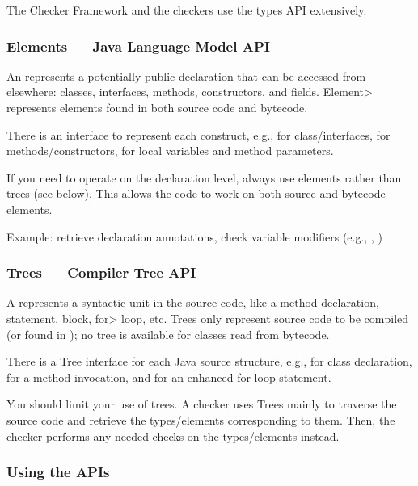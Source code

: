 The Checker Framework and the checkers use the types API extensively.


\subsubsection{Elements --- Java Language Model API\label{javac-elements}}

An  represents a potentially-public
declaration that can be accessed from elsewhere:  classes, interfaces, methods, constructors, and
fields.  \<Element> represents elements found in both source
code and bytecode.

There is an  interface to represent each construct, e.g.,
 for class/interfaces,  for
methods/constructors,  for local variables and
method parameters.

If you need to operate on the declaration level, always use elements rather
than trees
(see below).  This allows the code to work on
both source and bytecode elements.

Example: retrieve declaration annotations, check variable
modifiers (e.g., , )


\subsubsection{Trees --- Compiler Tree API\label{javac-trees}}

A  represents a syntactic unit in the source code,
like a method declaration, statement, block, \<for> loop, etc. Trees only
represent source code to be compiled (or found in );
no tree is available for classes read from bytecode.

There is a Tree interface for each Java source structure, e.g.,
 for class declaration, 
for a method invocation, and  for an enhanced-for-loop
statement.

You should limit your use of trees. A checker uses Trees mainly to
traverse the source code and retrieve the types/elements corresponding to
them.  Then, the checker performs any needed checks on the types/elements instead.


\subsubsection{Using the APIs\label{using-the-apis}}

